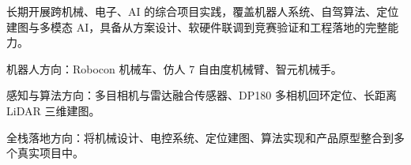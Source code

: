 
\begin{cvparagraph}
长期开展跨机械、电子、AI 的综合项目实践，覆盖机器人系统、自驾算法、定位建图与多模态 AI，具备从方案设计、软硬件联调到竞赛验证和工程落地的完整能力。
\end{cvparagraph}
\begin{cvitems}
  \item {机器人方向：Robocon 机械车、仿人 7 自由度机械臂、智元机械手。}
  \item {感知与算法方向：多目相机与雷达融合传感器、DP180 多相机回环定位、长距离 LiDAR 三维建图。}
  \item {全栈落地方向：将机械设计、电控系统、定位建图、算法实现和产品原型整合到多个真实项目中。}
\end{cvitems}
